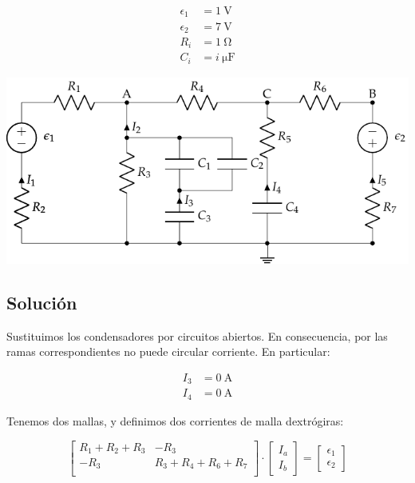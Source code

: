\documentclass[10pt]{article}
\begin{document}
\begin{minipage}[c]{0.3\linewidth}
  \begin{align*}
    \epsilon_1&=\SI{1}{\volt}\\
    \epsilon_2&=\SI{7}{\volt}\\
    R_i &= \SI{1}{\ohm}\\
    C_i &= \SI{i}{\micro\farad}
  \end{align*}
\end{minipage}
\begin{minipage}[c]{0.7\linewidth}
  \includegraphics{../figs/mallas_agrupacion_condensadores.pdf}
\end{minipage}

\subsection*{Solución}

Sustituimos los condensadores por circuitos abiertos. En consecuencia, por las ramas correspondientes no puede circular corriente. En particular:

\begin{align*}
  I_3 &= \SI{0}{\ampere}\\
  I_4 &= \SI{0}{\ampere}
\end{align*}

Tenemos dos mallas, y definimos dos corrientes de malla dextrógiras:

\begin{equation*}
  \begin{bmatrix}
    R_1 + R_2 + R_3 & -R_3\\
    -R_3 & R_3 + R_4 + R_6 + R_7\\
  \end{bmatrix} \cdot %
  \begin{bmatrix}
    I_a\\
    I_b
  \end{bmatrix} = %
  \begin{bmatrix}
    \epsilon_1\\
    \epsilon_2
  \end{bmatrix}
\end{equation*}
\end{document}
